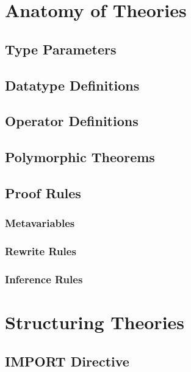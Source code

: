 \section{Anatomy of Theories} \label{anatomy}
\subsection{Type Parameters}
\subsection{Datatype Definitions}
\subsection{Operator Definitions}
\subsection{Polymorphic Theorems}
\subsection{Proof Rules}
\subsubsection{Metavariables}
\subsubsection{Rewrite Rules}
\subsubsection{Inference Rules}
\section{Structuring Theories} \label{structuring}
\subsection{IMPORT Directive}